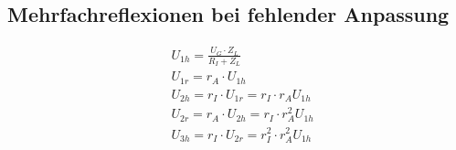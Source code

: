\subsection{Mehrfachreflexionen bei fehlender Anpassung}



\begin{align*}
    &U_{1h} =  \frac{U_G\cdot Z_L}{R_I + Z_L}\\
    &U_{1r} = r_A\cdot U_{1h}\\
    &U_{2h} =  r_I\cdot U_{1r} = r_I\cdot r_A U_{1h}\\
    &U_{2r} =  r_A\cdot U_{2h} = r_I\cdot r_A^2 U_{1h}\\
    &U_{3h} =  r_I\cdot U_{2r} = r_I^2\cdot r_A^2 U_{1h}
\end{align*}

